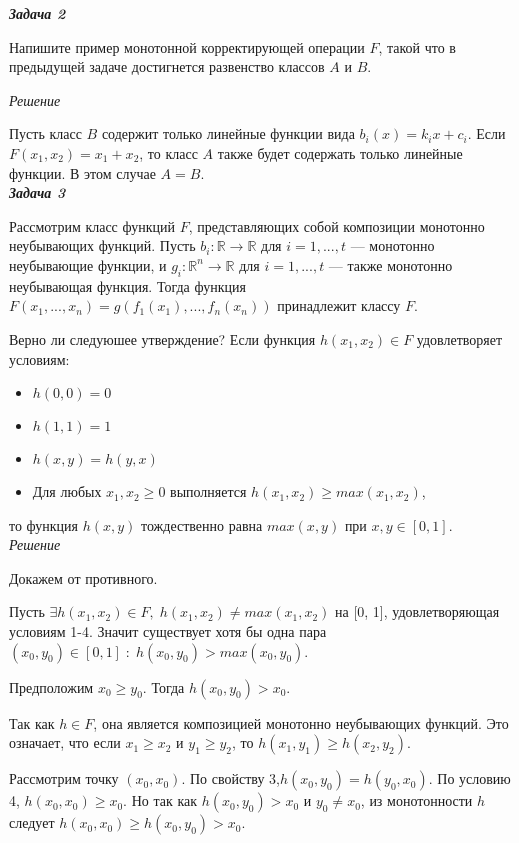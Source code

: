 \textbf{\emph{Задача 2}}

Напишите пример монотонной корректирующей операции $F$, такой что в предыдущей задаче достигнется развенство классов $A$ и $B$.


\textit{Решение}

Пусть класс $B$ содержит только линейные функции вида $b_i(x) = k_i x + c_i$. Если $F(x_1, x_2) = x_1 + x_2$, то класс $A$ также будет содержать только линейные функции. В этом случае $A = B$.\\

\textbf{\emph{Задача 3}}

Рассмотрим класс функций $F$, представляющих собой композиции монотонно неубывающих функций. Пусть $b_i: \mathbb{R} \rightarrow \mathbb{R}$ для $i = 1, ..., t$ — монотонно неубывающие функции, и $g_i: \mathbb{R}^n \rightarrow \mathbb{R}$ для $i = 1, ..., t$ — также монотонно неубывающая функция. Тогда функция $F(x_1, ..., x_n) = g(f_1(x_1), ..., f_n(x_n))$ принадлежит классу $F$.

Верно ли следуюшее утверждение? Если функция $h(x_1, x_2) \in F$ удовлетворяет условиям:

\begin{itemize}
\item $h(0, 0) = 0$
\item $h(1, 1) = 1$
\item $h(x, y) = h(y, x)$
\item Для любых $x_1, x_2 \geq 0$ выполняется $h(x_1, x_2) \geq max(x_1, x_2)$,

\end{itemize}


то функция $h(x, y)$ тождественно равна $max(x, y)$ при $x, y \in [0, 1]$.\\

\textit{Решение}

Докажем от противного.

Пусть $\exists h(x_1, x_2) \in F, \; h(x_1, x_2) \neq max(x_1, x_2)$ на [0, 1], удовлетворяющая условиям 1-4.  Значит существует хотя бы одна пара $(x_0, y_0) \in [0, 1] \; : \; h(x_0, y_0)> max(x_0, y_0)$.

Предположим $x_0 \geq y_0$. Тогда $h(x_0, y_0) > x_0$.

Так как $h \in F$,  она является композицией монотонно неубывающих функций.  Это означает, что если $x_1 \geq x_2$ и $y_1 \geq y_2$, то $h(x_1, y_1) \geq h(x_2, y_2)$.

Рассмотрим точку $(x_0, x_0)$.  По свойству 3,$ h(x_0, y_0) = h(y_0, x_0)$.  По условию 4, $h(x_0, x_0) \geq x_0$.  Но так как $h(x_0, y_0) > x_0$ и $y_0 \neq x_0$,  из монотонности $h$ следует   $h(x_0, x_0) \geq h(x_0, y_0) > x_0$.


